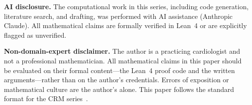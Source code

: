 \documentclass[11pt]{article}
\theoremstyle{plain}
\theoremstyle{definition}
\theoremstyle{remark}
\begin{document}
\medskip
\noindent\textbf{AI disclosure.}
The computational work in this series, including code generation,
literature search, and drafting, was performed with AI assistance
(Anthropic Claude).  All mathematical claims are formally verified
in Lean~4 or are explicitly flagged as unverified.

\medskip
\noindent\textbf{Non-domain-expert disclaimer.}
The author is a practicing cardiologist and not a professional
mathematician.  All mathematical claims in this paper should be
evaluated on their formal content---the Lean~4 proof code and the
written arguments---rather than on the author's credentials.
Errors of exposition or mathematical culture are the author's
alone.  This paper follows the standard format for the CRM
series~\cite{format-guide}.


\end{document}
